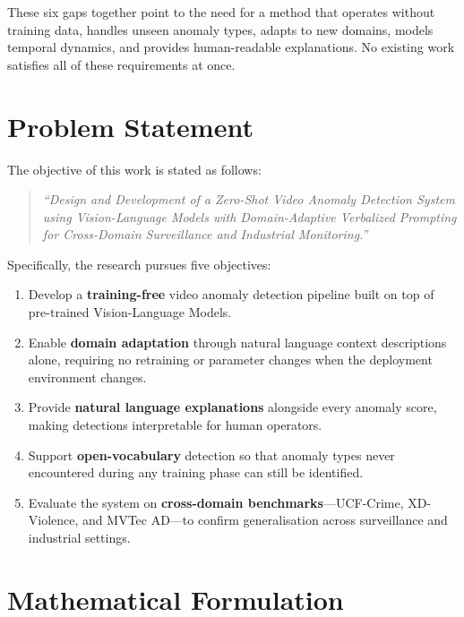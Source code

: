 These six gaps together point to the need for a method that operates without training data, handles unseen anomaly types, adapts to new domains, models temporal dynamics, and provides human-readable explanations. No existing work satisfies all of these requirements at once.


\section{Problem Statement}
\label{sec:problem_statement}

The objective of this work is stated as follows:

\begin{quote}
\textit{``Design and Development of a Zero-Shot Video Anomaly Detection System using Vision-Language Models with Domain-Adaptive Verbalized Prompting for Cross-Domain Surveillance and Industrial Monitoring.''}
\end{quote}

\noindent Specifically, the research pursues five objectives:

\begin{enumerate}[leftmargin=*]
    \item Develop a \textbf{training-free} video anomaly detection pipeline built on top of pre-trained Vision-Language Models.
    \item Enable \textbf{domain adaptation} through natural language context descriptions alone, requiring no retraining or parameter changes when the deployment environment changes.
    \item Provide \textbf{natural language explanations} alongside every anomaly score, making detections interpretable for human operators.
    \item Support \textbf{open-vocabulary} detection so that anomaly types never encountered during any training phase can still be identified.
    \item Evaluate the system on \textbf{cross-domain benchmarks}---UCF-Crime, XD-Violence, and MVTec AD---to confirm generalisation across surveillance and industrial settings.
\end{enumerate}


\section{Mathematical Formulation}
\label{sec:formulation}

